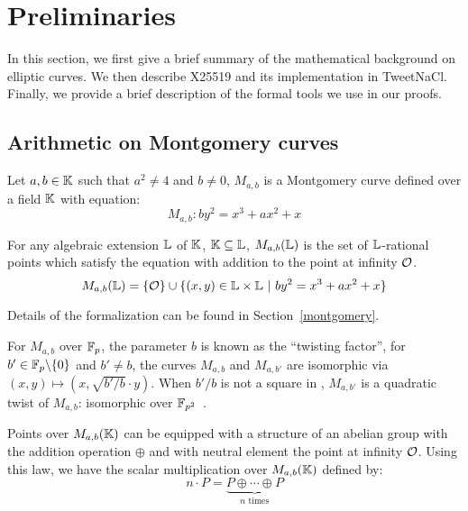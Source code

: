 \section{Preliminaries}
\label{preliminaries}

In this section, we first give a brief summary of the mathematical background
on elliptic curves. We then describe X25519 and its implementation in TweetNaCl.
Finally, we provide a brief description of the formal tools we use in our proofs.

\subsection{Arithmetic on Montgomery curves}
\label{subsec:montgomery}

\begin{definition}
  Let $a,b \in \mathbb{K}$ such that $a^2 \neq 4$ and $b \neq 0$, $M_{a,b}$ is a
  Montgomery curve defined over a field $\mathbb{K}$ with equation:
  $$M_{a,b}: by^2 = x^3 + ax^2 + x$$
\end{definition}

\begin{definition}
  For any algebraic extension $\mathbb{L}$ of $\mathbb{K}$, $\mathbb{K} \subseteq	\mathbb{L}$,
  $M_{a,b}(\mathbb{L})$ is the set of $\mathbb{L}$-rational points which satisfy the equation with
  addition to the point at infinity $\mathcal{O}$.
  $$M_{a,b}(\mathbb{L}) = \{\mathcal{O}\} \cup \{(x,y) \in \mathbb{L} \times \mathbb{L}~|~by^2 = x^3 + ax^2 + x\}$$
\end{definition}
Details of the formalization can be found in Section~\ref{montgomery}.

\begin{definition}
  For $M_{a,b}$ over $\mathbb{F}_{p}$, the parameter $b$ is known as the ``twisting factor'',
  for $b'\in \mathbb{F}_{p}\backslash\{0\}$ and $b' \neq b$, the curves $M_{a,b}$ and $M_{a,b'}$
  are isomorphic via $(x,y) \mapsto (x, \sqrt{b'/b} \cdot y)$.
  When $b'/b$ is not a square in , $M_{a,b'}$ is a quadratic twist of $M_{a,b}$:
  isomorphic over $\mathbb{F}_{p^2}$~\cite{cryptoeprint:2017:212}.
\end{definition}

Points over $M_{a,b}(\mathbb{K})$ can be equipped with a structure of an abelian group
with the addition operation $\oplus$ and with neutral element the point at infinity $\mathcal{O}$.
Using this law, we have the scalar multiplication over $M_{a,b}(\mathbb{K})$ defined by:
  $$n\cdot P = \underbrace{P \oplus \cdots \oplus P}_{n\text{ times}}$$

